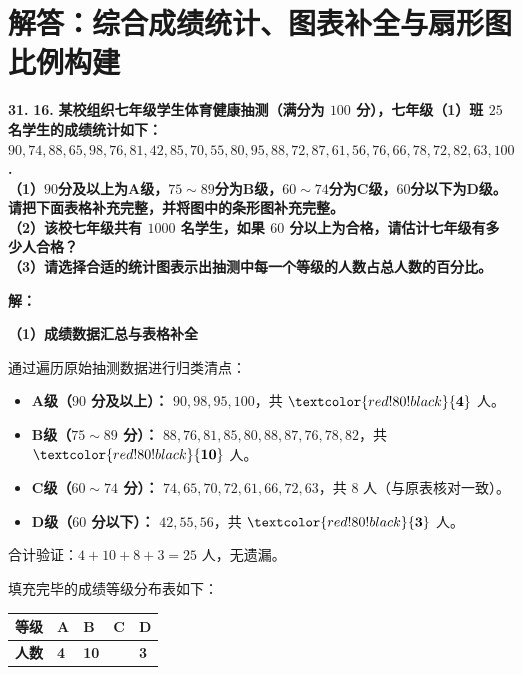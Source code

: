\newpage



\newpage

\section{解答：综合成绩统计、图表补全与扇形图比例构建}

\vspace{0.6cm}

\textbf{\LARGE 31.} \textbf{\color{cyan!80!blue} 16. }\textbf{某校组织七年级学生体育健康抽测（满分为 $100$ 分），七年级（1）班 $25$ 名学生的成绩统计如下：\\
$90, 74, 88, 65, 98, 76, 81, 42, 85, 70, 55, 80, 95, 88, 72, 87, 61, 56, 76, 66, 78, 72, 82, 63, 100$. \\[6pt]
（1）$90$分及以上为A级，$75\sim 89$分为B级，$60\sim 74$分为C级，$60$分以下为D级。请把下面表格补充完整，并将图中的条形图补充完整。\\
（2）该校七年级共有 $1000$ 名学生，如果 $60$ 分以上为合格，请估计七年级有多少人合格？\\
（3）请选择合适的统计图表示出抽测中每一个等级的人数占总人数的百分比。}

\vspace{0.4cm}
\textbf{解：}

\textbf{（1）成绩数据汇总与表格补全}

通过遍历原始抽测数据进行归类清点：
\begin{itemize}
    \item \textbf{A级（$90$ 分及以上）：} $90, 98, 95, 100$，共 $\textcolor{red!80!black}{\mathbf{4}}$ 人。
    \item \textbf{B级（$75\sim 89$ 分）：} $88, 76, 81, 85, 80, 88, 87, 76, 78, 82$，共 $\textcolor{red!80!black}{\mathbf{10}}$ 人。
    \item \textbf{C级（$60\sim 74$ 分）：} $74, 65, 70, 72, 61, 66, 72, 63$，共 \textbf{$8$} 人（与原表核对一致）。
    \item \textbf{D级（$60$ 分以下）：} $42, 55, 56$，共 $\textcolor{red!80!black}{\mathbf{3}}$ 人。
\end{itemize}
合计验证：$4 + 10 + 8 + 3 = 25$ 人，无遗漏。

填充完毕的成绩等级分布表如下：
\begin{center}
\renewcommand{\arraystretch}{1.8}
\setlength{\arrayrulewidth}{0.8pt}
\begin{tabular}{|>{\centering\arraybackslash}p{2cm}|>{\centering\arraybackslash}p{2cm}|>{\centering\arraybackslash}p{2cm}|>{\centering\arraybackslash}p{2cm}|>{\centering\arraybackslash}p{2cm}|}
\hline
\textbf{等级} & \textbf{A} & \textbf{B} & \textbf{C} & \textbf{D} \\
\hline
\textbf{人数} & \textcolor{red!80!black}{\textbf{4}} & \textcolor{red!80!black}{\textbf{10}} & 8 & \textcolor{red!80!black}{\textbf{3}} \\
\hline
\end{tabular}
\end{center}

